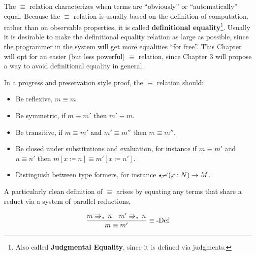The $\equiv$ relation characterizes when terms are ``obviously'' or ``automatically'' equal.
Because the $\equiv$ relation is usually based on the definition of computation, rather than on observable properties, it is called \textbf{definitional equality}\footnote{
  Also called \textbf{Judgmental Equality}, since it is defined via judgments.
}.
Usually it is desirable to make the definitional equality relation as large as possible, since the programmer in the system will get more equalities ``for free''.
This Chapter will opt for an easier (but less powerful) $\equiv$ relation, since Chapter 3 will propose a way to avoid definitional equality in general.
 
In a progress and preservation style proof, the $\equiv$ relation should:
 
\begin{itemize}
\item Be reflexive, $m\equiv m$.
\item Be symmetric, if $m\equiv m'$ then $m'\equiv m$. %
\item Be transitive, if $m\equiv m'$ and $m'\equiv m''$ then $m\equiv m''$.
\item Be closed under substitutions and evaluation, for instance if $m\equiv m'$ and $n\equiv n'$ then $m\left[x\coloneqq n\right]\equiv m'\left[x\coloneqq n'\right]$.
\item Distinguish between type formers, for instance $\star\cancel{\equiv}\left(x:N\right)\rightarrow M$.
\end{itemize}
A particularly clean definition of $\equiv$ arises by equating any terms that share a reduct via a system of parallel reductions,
 
\[
\frac{m\Rrightarrow_{\ast}\,n\quad m'\Rrightarrow_{\ast}\,n}{m\equiv m'}\,\operatorname{\equiv-Def}
\]
 
